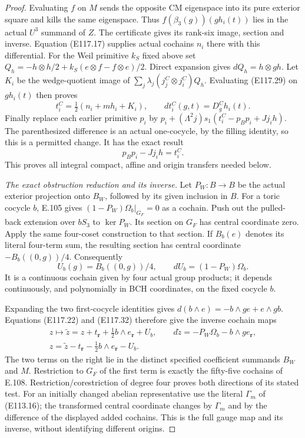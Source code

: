 \begin{proof}
Evaluating $f$ on $M$ sends the opposite CM eigenspace
into its pure exterior square and kills the same eigenspace.
Thus $f(\beta_3(g))(g h_i(t))$ lies in the actual $U^3$
summand of $Z$.  The certificate gives its rank-six image,
section and inverse.  Equation (E117.17) supplies actual
cochains $n_i$ there with this differential.
For the Weil primitive $k_S$ fixed above set
$Q_h=-h\otimes h/2+k_S(e\otimes f-f\otimes e)/2$.
Direct expansion gives $dQ_h=h\otimes gh$.
Let $K_i$ be the wedge-quotient image of
$\sum_j\lambda_j(j_j^C\otimes j_i^C)Q_h$.
Evaluating (E117.29) on $g h_i(t)$ then proves
\[
 t_i^C=\tfrac12(n_i+m h_i+K_i),\qquad
 dt_i^C(g,t)=D^C_g h_i(t).
 \tag{E117.30}
\]
Finally replace each earlier primitive $p_i$ by
$p_i+(\Lambda^2j)s_1(t_i^C-p_Bp_i+Jj_i h)$.
The parenthesized difference is an actual one-cocycle,
by the filling identity, so this is a permitted change.
It has the exact result
\[
                 p_Bp_i-Jj_i h=t_i^C.
 \tag{E117.31}
\]
This proves all integral compact, affine and origin
transfers needed below.

\emph{The exact obstruction reduction and its inverse.}
Let $P_W:B\to B$ be the actual exterior projection onto
$B_W$, followed by its given inclusion in $B$.
For a toric cocycle $b$, E.105 gives
$(1-P_W)\Omega_b|_{G_F}=0$ as a cochain.
Push out the pulled-back extension over $bS_3$ to
$\ker P_W$.  Its section on $G_F$ has central coordinate
zero.  Apply the same four-coset construction to that section.
If $B_b(e)$ denotes its literal four-term sum, the resulting
section has central coordinate $-B_b((0,g))/4$.
Consequently
\[
 U_b(g)=B_b((0,g))/4,\qquad
        dU_b=(1-P_W)\Omega_b.
 \tag{E117.32}
\]
It is a continuous cochain given by four actual group products;
it depends continuously, and polynomially in BCH coordinates,
on the fixed cocycle $b$.

Expanding the two first-cocycle identities gives
$d(b\wedge e)=-b\wedge ge+e\wedge gb$.
Equations (E117.22) and (E117.32) therefore give the inverse
cochain maps
\[
 \begin{gathered}
 z\longmapsto
 \widetilde z=z+t_{\mathbf r}+\tfrac12 b\wedge e_{\mathbf r}+U_b,
 \qquad
 d\widetilde z=-P_W\Omega_b-b\wedge g e_{\mathbf r},\\
 z=\widetilde z-t_{\mathbf r}
                  -\tfrac12 b\wedge e_{\mathbf r}-U_b.
 \end{gathered}
 \tag{E117.33}
\]
The two terms on the right lie in the distinct specified
coefficient summands $B_W$ and $M$.
Restriction to $G_F$ of the first term is exactly the
fifty-five cochains of E.108.  Restriction/corestriction of
degree four proves both directions of its stated test.
For an initially changed abelian representative use the
literal $\Gamma_m$ of (E113.16); the transformed central
coordinate changes by $\Gamma_m$ and by the difference
of the displayed added cochains.  This is the full gauge
map and its inverse, without identifying different origins.


\end{proof}
